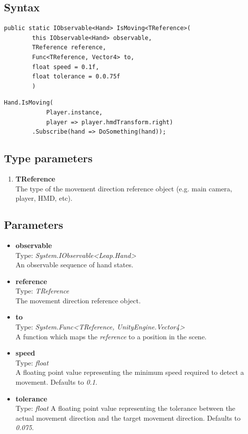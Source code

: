 \documentclass[12pt,a4paper,twoside]{report}
\begin{document}
\subsection{Syntax}
\begin{lstlisting}[caption=Declaration]
    public static IObservable<Hand> IsMoving<TReference>(
        this IObservable<Hand> observable,
        TReference reference,
        Func<TReference, Vector4> to,
        float speed = 0.1f,
        float tolerance = 0.0.75f
        )
\end{lstlisting}

\begin{lstlisting}[caption=Usage example]
    Hand.IsMoving(
            Player.instance,
            player => player.hmdTransform.right)
        .Subscribe(hand => DoSomething(hand));
\end{lstlisting}

\subsection{Type parameters}
\begin{enumerate}
    \item \textbf{TReference}\\
    The type of the movement direction reference object (e.g. main camera, player, HMD, etc).
\end{enumerate}

\subsection{Parameters}
\begin{itemize}
    \item \textbf{observable}\\
        Type: \textit{System.IObservable<Leap.Hand>}\\
        An observable sequence of hand states.
    \item \textbf{reference}\\
        Type: \textit{TReference}\\
        The movement direction reference object.
    \item \textbf{to}\\
        Type: \textit{System.Func<TReference, UnityEngine.Vector4>}\\
        A function which maps the \textit{reference} to a position in the scene.
    \item \textbf{speed}\\
        Type: \textit{float}\\
        A floating point value representing the minimum speed required to detect a movement. Defaults to
        \textit{0.1}.
        
    \item \textbf{tolerance}\\
        Type: \textit{float}
        A floating point value representing the tolerance between the actual movement direction and the target movement direction. Defaults to \textit{0.075}.
\end{itemize}
\end{document}
